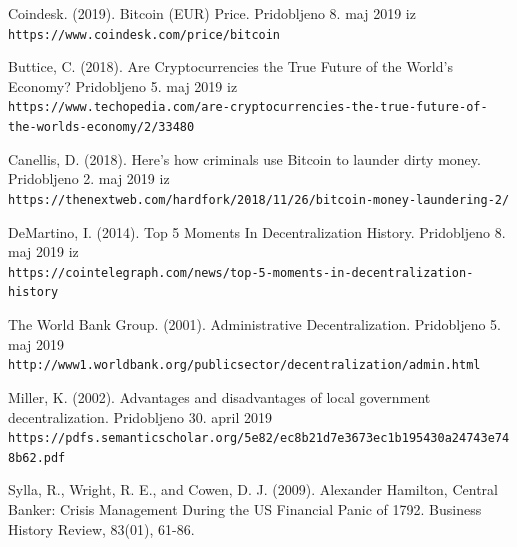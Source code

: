 \documentclass[letterpaper, titlepage, freqn]{article}
\begin{document}
\begin{thebibliography}{9}

\bibitem{} 
Coindesk. (2019). Bitcoin (EUR) Price. Pridobljeno 8. maj 2019 iz
\\\texttt{https://www.coindesk.com/price/bitcoin}

\bibitem{} 
Buttice, C. (2018). Are Cryptocurrencies the True Future of the World's Economy? Pridobljeno 5. maj 2019 iz
\\\texttt{https://www.techopedia.com/are-cryptocurrencies-the-true-future-of-the-worlds-economy/2/33480}


\bibitem{} 
Canellis, D. (2018). Here’s how criminals use Bitcoin to launder dirty money. Pridobljeno 2. maj 2019 iz
\\\texttt{https://thenextweb.com/hardfork/2018/11/26/bitcoin-money-laundering-2/}


\bibitem{} 
DeMartino, I. (2014). Top 5 Moments In Decentralization History. Pridobljeno 8. maj 2019 iz
\\\texttt{https://cointelegraph.com/news/top-5-moments-in-decentralization-history}

\bibitem{} 
The World Bank Group. (2001). Administrative Decentralization. Pridobljeno 5. maj 2019
\\\texttt{http://www1.worldbank.org/publicsector/decentralization/admin.html}

\bibitem{} 
Miller, K. (2002). Advantages and disadvantages of local government decentralization. Pridobljeno 30. april 2019
\\\texttt{https://pdfs.semanticscholar.org/5e82/ec8b21d7e3673ec1b195430a24743e748b62.pdf}

\bibitem
Sylla, R., Wright, R. E., and Cowen, D. J. (2009). Alexander Hamilton, Central Banker: Crisis Management During the US Financial Panic of 1792. Business History Review, 83(01), 61-86. 



\end{thebibliography}
\end{document}
